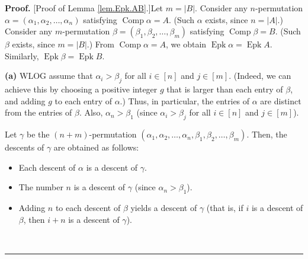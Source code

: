 \documentclass[numbers=enddot,12pt,final,onecolumn,notitlepage]{scrartcl}%
\theoremstyle{definition}
\newenvironment{proof}[1][Proof]{\noindent\textbf{#1.} }{\ \rule{0.5em}{0.5em}}
\newenvironment{verlong}{}{}
\begin{document}
\begin{verlong}
\begin{proof}
[Proof of Lemma \ref{lem.Epk.AB}.]Let $m=\left\vert B\right\vert $. Consider
any $n$-permutation $\alpha=\left(  \alpha_{1},\alpha_{2},\ldots,\alpha
_{n}\right)  $ satisfying $\operatorname*{Comp}\alpha=A$. (Such $\alpha$
exists, since $n=\left\vert A\right\vert $.) Consider any $m$-permutation
$\beta=\left(  \beta_{1},\beta_{2},\ldots,\beta_{m}\right)  $ satisfying
$\operatorname*{Comp}\beta=B$. (Such $\beta$ exists, since $m=\left\vert
B\right\vert $.) From $\operatorname*{Comp}\alpha=A$, we obtain
$\operatorname*{Epk}\alpha=\operatorname*{Epk}A$. Similarly,
$\operatorname*{Epk}\beta=\operatorname*{Epk}B$.

\textbf{(a)} WLOG assume that $\alpha_{i}>\beta_{j}$ for all $i\in\left[
n\right]  $ and $j\in\left[  m\right]  $. (Indeed, we can achieve this by
choosing a positive integer $g$ that is larger than each entry of $\beta$, and
adding $g$ to each entry of $\alpha$.) Thus, in particular, the entries of
$\alpha$ are distinct from the entries of $\beta$. Also, $\alpha_{n}>\beta
_{1}$ (since $\alpha_{i}>\beta_{j}$ for all $i\in\left[  n\right]  $ and
$j\in\left[  m\right]  $).

Let $\gamma$ be the $\left(  n+m\right)  $-permutation $\left(  \alpha
_{1},\alpha_{2},\ldots,\alpha_{n},\beta_{1},\beta_{2},\ldots,\beta_{m}\right)
$. Then, the descents of $\gamma$ are obtained as follows:

\begin{itemize}
\item Each descent of $\alpha$ is a descent of $\gamma$.

\item The number $n$ is a descent of $\gamma$ (since $\alpha_{n}>\beta_{1}$).

\item Adding $n$ to each descent of $\beta$ yields a descent of $\gamma$ (that
is, if $i$ is a descent of $\beta$, then $i+n$ is a descent of $\gamma$).
\end{itemize}


\end{proof}
\end{verlong}
\end{document}
